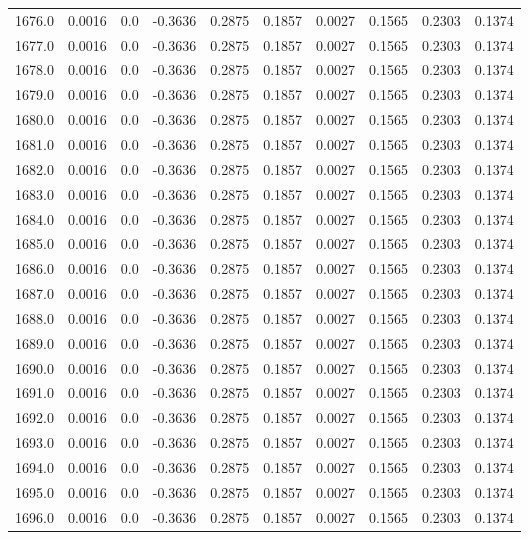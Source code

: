 \begin{longtable}{lrrrrrrrrr}
1676.0 & 0.0016 & 0.0 & -0.3636 & 0.2875 & 0.1857 & 0.0027 & 0.1565 & 0.2303 & 0.1374 \\
1677.0 & 0.0016 & 0.0 & -0.3636 & 0.2875 & 0.1857 & 0.0027 & 0.1565 & 0.2303 & 0.1374 \\
1678.0 & 0.0016 & 0.0 & -0.3636 & 0.2875 & 0.1857 & 0.0027 & 0.1565 & 0.2303 & 0.1374 \\
1679.0 & 0.0016 & 0.0 & -0.3636 & 0.2875 & 0.1857 & 0.0027 & 0.1565 & 0.2303 & 0.1374 \\
1680.0 & 0.0016 & 0.0 & -0.3636 & 0.2875 & 0.1857 & 0.0027 & 0.1565 & 0.2303 & 0.1374 \\
1681.0 & 0.0016 & 0.0 & -0.3636 & 0.2875 & 0.1857 & 0.0027 & 0.1565 & 0.2303 & 0.1374 \\
1682.0 & 0.0016 & 0.0 & -0.3636 & 0.2875 & 0.1857 & 0.0027 & 0.1565 & 0.2303 & 0.1374 \\
1683.0 & 0.0016 & 0.0 & -0.3636 & 0.2875 & 0.1857 & 0.0027 & 0.1565 & 0.2303 & 0.1374 \\
1684.0 & 0.0016 & 0.0 & -0.3636 & 0.2875 & 0.1857 & 0.0027 & 0.1565 & 0.2303 & 0.1374 \\
1685.0 & 0.0016 & 0.0 & -0.3636 & 0.2875 & 0.1857 & 0.0027 & 0.1565 & 0.2303 & 0.1374 \\
1686.0 & 0.0016 & 0.0 & -0.3636 & 0.2875 & 0.1857 & 0.0027 & 0.1565 & 0.2303 & 0.1374 \\
1687.0 & 0.0016 & 0.0 & -0.3636 & 0.2875 & 0.1857 & 0.0027 & 0.1565 & 0.2303 & 0.1374 \\
1688.0 & 0.0016 & 0.0 & -0.3636 & 0.2875 & 0.1857 & 0.0027 & 0.1565 & 0.2303 & 0.1374 \\
1689.0 & 0.0016 & 0.0 & -0.3636 & 0.2875 & 0.1857 & 0.0027 & 0.1565 & 0.2303 & 0.1374 \\
1690.0 & 0.0016 & 0.0 & -0.3636 & 0.2875 & 0.1857 & 0.0027 & 0.1565 & 0.2303 & 0.1374 \\
1691.0 & 0.0016 & 0.0 & -0.3636 & 0.2875 & 0.1857 & 0.0027 & 0.1565 & 0.2303 & 0.1374 \\
1692.0 & 0.0016 & 0.0 & -0.3636 & 0.2875 & 0.1857 & 0.0027 & 0.1565 & 0.2303 & 0.1374 \\
1693.0 & 0.0016 & 0.0 & -0.3636 & 0.2875 & 0.1857 & 0.0027 & 0.1565 & 0.2303 & 0.1374 \\
1694.0 & 0.0016 & 0.0 & -0.3636 & 0.2875 & 0.1857 & 0.0027 & 0.1565 & 0.2303 & 0.1374 \\
1695.0 & 0.0016 & 0.0 & -0.3636 & 0.2875 & 0.1857 & 0.0027 & 0.1565 & 0.2303 & 0.1374 \\
1696.0 & 0.0016 & 0.0 & -0.3636 & 0.2875 & 0.1857 & 0.0027 & 0.1565 & 0.2303 & 0.1374 \\

\end{longtable}
